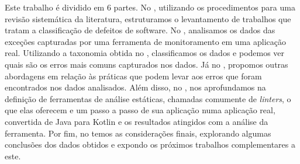 Este trabalho é dividido em 6 partes. No , utilizando os procedimentos para uma revisão sistemática da literatura, estruturamos o levantamento de trabalhos que tratam a classificação de defeitos de software. No , analisamos os dados das exceções capturadas por uma ferramenta de monitoramento em uma aplicação real. Utilizando a taxonomia obtida no , classificamos os dados e podemos ver quais são os erros mais comuns capturados nos dados. Já no , propomos outras abordagens em relação às práticas que podem levar aos erros que foram encontrados nos dados analisados. Além disso, no , nos aprofundamos na definição de ferramentas de análise estáticas, chamadas comumente de \textit{linters}, o que elas oferecem e um passo a passo de sua aplicação numa aplicação real, convertida de Java para Kotlin e os resultados atingidos com a análise da ferramenta. Por fim, no  temos as considerações finais, explorando algumas conclusões dos dados obtidos e expondo os próximos trabalhos complementares a este.
